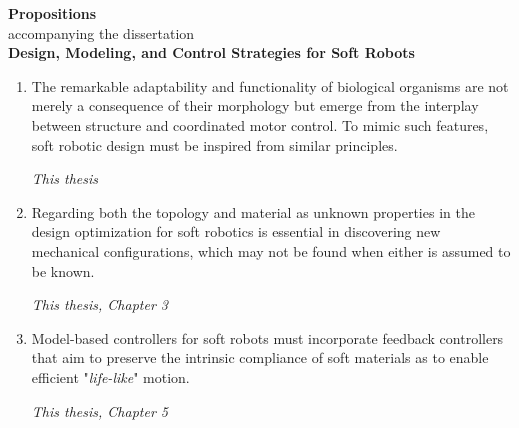 \documentclass[a5paper]{article}
\renewcommand{\normalsize}{\fontsize{9}{9}\selectfont}
\newcommand{\largesize}{\fontsize{10}{9}\selectfont}
\begin{document}
\begin{center}
\largesize \textbf{Propositions} \\[0.45em]
\normalsize accompanying the dissertation \\[0.45em]
{\textbf{\largesize Design, Modeling, and Control Strategies for Soft Robots}}
\end{center}

\normalsize
\vspace{-1mm}

\begin{enumerate}
  \setlength\itemsep{0.65em}
  \item The remarkable adaptability and functionality of biological organisms are not merely a consequence of their morphology but emerge from the interplay between structure and coordinated motor control. To mimic such features, soft robotic design must be inspired from similar principles.
  \begin{flushright}
  \vspace{-5mm}
  \textit{This thesis}
  \vspace{-1mm}
  \end{flushright}

  \item Regarding both the topology and material as unknown properties in the design optimization for soft robotics is essential in discovering new mechanical configurations, which may not be found when either is \mbox{assumed} to be known. 
  \begin{flushright}
  \vspace{-5mm}
  \textit{This thesis, Chapter 3}
  \vspace{-1mm}
  \end{flushright}

  \item Model-based controllers for soft robots must incorporate feedback controllers that aim to preserve the intrinsic compliance of soft materials as to enable efficient "\textit{life-like}" motion.
  \begin{flushright}
  \vspace{-5mm}
  \textit{This thesis, Chapter 5}
  \vspace{-1mm}
  \end{flushright}
  

\end{enumerate}
\end{document}

